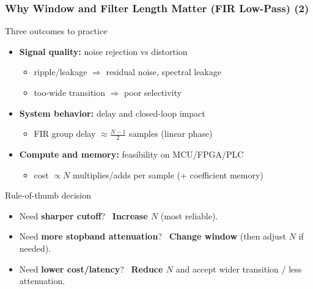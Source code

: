 \begin{frame}
	\frametitle{Why Window and Filter Length Matter (FIR Low-Pass) (2)}
	\begin{block}{Three outcomes to practice}
		\begin{itemize}
			\item \textbf{Signal quality:} noise rejection vs distortion
			\begin{itemize}
				\item ripple/leakage $\Rightarrow$ residual noise, spectral leakage
				\item too-wide transition $\Rightarrow$ poor selectivity
			\end{itemize}
			\item \textbf{System behavior:} delay and closed-loop impact
			\begin{itemize}
				\item FIR group delay $\approx \frac{N-1}{2}$ samples (linear phase)
			\end{itemize}
			\item \textbf{Compute and memory:} feasibility on MCU/FPGA/PLC
			\begin{itemize}
				\item cost $\propto N$ multiplies/adds per sample (+ coefficient memory)
			\end{itemize}
		\end{itemize}
	\end{block}
	\begin{alertblock}{Rule-of-thumb decision}
		\begin{itemize}
			\item Need \textbf{sharper cutoff}? \ \textbf{Increase $N$} (most reliable).
			\item Need \textbf{more stopband attenuation}? \ \textbf{Change window} (then adjust $N$ if needed).
			\item Need \textbf{lower cost/latency}? \ \textbf{Reduce $N$} and accept wider transition / less attenuation.
		\end{itemize}
	\end{alertblock}
\end{frame}

